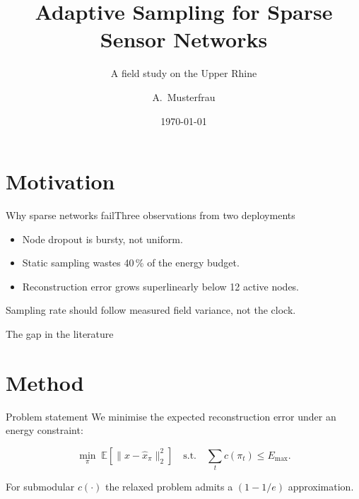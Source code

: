 \documentclass[aspectratio=169,10pt]{beamer}
\title{Adaptive Sampling for Sparse Sensor Networks}
\subtitle{A field study on the Upper Rhine}
\author{A.~Musterfrau}
\institute{Technische Hochschule Bingen}
\date{\today}
\begin{document}
\thbtitleframe
\thboutline

\section{Motivation}

\begin{frame}{Why sparse networks fail}{Three observations from two deployments}
  \begin{itemize}
    \item Node dropout is bursty, not uniform.
    \item Static sampling wastes 40\,\% of the energy budget.
    \item Reconstruction error grows superlinearly below 12 active nodes.
  \end{itemize}
  \vspace{0.8em}
  \begin{takeaway}
    Sampling rate should follow measured field variance, not the clock.
  \end{takeaway}
\end{frame}

\begin{frame}{The gap in the literature}
  \vspace{1em}
\end{frame}

\section{Method}

\begin{frame}{Problem statement}
  We minimise the expected reconstruction error under an energy constraint:
  \begin{keyeq}
    \begin{equation}
      \min_{\pi}\; \mathbb{E}\!\left[\lVert x - \hat{x}_{\pi}\rVert_2^2\right]
      \quad\text{s.t.}\quad \sum_{t} c(\pi_t) \le E_{\max}.
    \end{equation}
  \end{keyeq}
  \begin{theorem}
    For submodular $c(\cdot)$ the relaxed problem admits a $(1-1/e)$ approximation.
  \end{theorem}
\end{frame}
\end{document}
